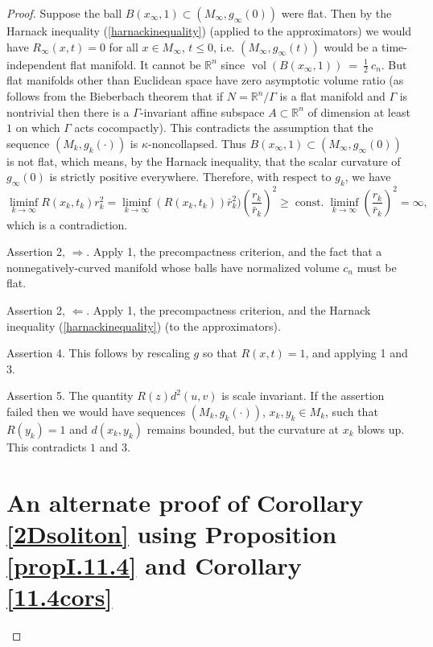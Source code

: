 \documentclass[12pt]{amsart}
\newcommand{\const}{\operatorname{const.}}
\newcommand{\Ga}{\Gamma}
\newcommand{\R}{{\mathbb R}}
\newcommand{\vol}{\operatorname{vol}}
\newcommand{\ra}{\rightarrow}
\numberwithin{equation}{section}
\theoremstyle{plain}
\theoremstyle{definition}
\theoremstyle{remark}
\begin{document}
\begin{proof}
Suppose the ball $B(x_\infty,1)\subset (M_\infty,g_\infty(0))$ were flat.
Then by the Harnack inequality (\ref{harnackinequality}) (applied to the approximators)
we would have $R_\infty(x,t)=0$ for all $x\in M_\infty$, $t\leq 0$,
i.e. $(M_\infty,g_\infty(t))$ would be a time-independent flat manifold.
It cannot be $\R^n$ since $\vol(B(x_\infty,1)) \: = \: \frac12 \: c_n$.
But flat manifolds other than Euclidean space have zero asymptotic volume ratio
(as follows from the Bieberbach theorem that if $N=\R^n/\Gamma$ is
a flat manifold and $\Ga$ is nontrivial then there is a $\Gamma$-invariant
affine subspace $A\subset \R^n$ of dimension at least $1$ 
on which $\Gamma$ acts cocompactly).
This contradicts the assumption that the sequence $(M_k,g_k(\cdot))$
is $\kappa$-noncollapsed.  Thus
$B(x_\infty,1)\subset (M_\infty,g_\infty(0))$ is not flat, which means,
by the Harnack inequality, that the 
scalar curvature of $g_\infty(0)$ is strictly positive
everywhere.  Therefore, with respect to $g_k$, we have
\begin{equation}
\liminf_{k\ra \infty}R(x_k,t_k)r_k^2=
\liminf_{k\ra\infty}(R(x_k,t_k))\bar 
r_k^2)\left(\frac{r_k}{\bar r_k}\right)^2
\geq \const
\liminf_{k\ra\infty}\left(\frac{r_k}{\bar r_k}\right)^2=\infty,
\end{equation}
which is a contradiction.

\bigskip
Assertion 2, $\Longrightarrow$.  Apply 1,  
the precompactness criterion, and the fact
that a nonnegatively-curved manifold whose balls
have normalized volume $c_n$ must be flat.

\bigskip
Assertion 2, $\Longleftarrow$. Apply 1, the precompactness criterion,
and the Harnack inequality (\ref{harnackinequality}) (to the approximators).

\bigskip
Assertion 4.  This follows by rescaling $g$ so that $R(x,t)=1$, and
applying 1 and 3.

\bigskip
Assertion 5.  The quantity $R(z)d^2(u,v)$ is scale invariant.
If the assertion failed then  we would have sequences $(M_k,g_k(\cdot))$,
$x_k,y_k\in M_k$, such that $R(y_k)=1$ and
$d(x_k,y_k)$ remains bounded, but the curvature at $x_k$ blows up.
This contradicts $1$ and $3$.




\section{An alternate proof of Corollary \ref{2Dsoliton}
using Proposition \ref{propI.11.4} and Corollary \ref{11.4cors}}
\label{altpf11.3}


\end{proof}
\end{document}
